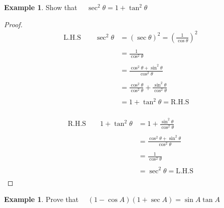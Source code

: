 \documentclass[11pt,a4paper]{article}
\theoremstyle{definition}
\newtheorem{example}[thm]{Example}
\begin{document}
\begin{example}

Show that $\quad  \sec^2\theta = 1 + \tan^2\theta$
\end{example}
\begin{proof}

\begin{align*}
\text{L.H.S}\qquad  \sec^2 \theta & = \left(\sec\theta\right)^2 = \left(\frac{1}{\cos\theta}\right)^2\\\\
& = \frac{1}{\cos^2\theta}\\\\
& = \frac{\cos^2\theta + \sin^2\theta}{\cos^2\theta}\\\\
& = \frac{\cos^2\theta}{\cos^2\theta} + \frac{\sin^2\theta}{\cos^2\theta}\\\\
& = 1 + \tan^2\theta = \text{R.H.S}\\
\end{align*}







\begin{align*}
\text{R.H.S}\qquad  1 + \tan^2\theta & = 1 + \frac{\sin^2\theta}{\cos^2\theta}\\\\
& = \frac{\cos^2\theta + \sin^2\theta}{\cos^2\theta}\\\\
& = \frac{1}{\cos^2\theta}\\\\
& = \sec^2\theta = \text{L.H.S}\\
\end{align*}
\end{proof}
\begin{example}

Prove that $\quad  \left( 1 - \cos A\right)\left(1 + \sec A\right) = \sin A \tan A$
\end{example}
\end{document}
